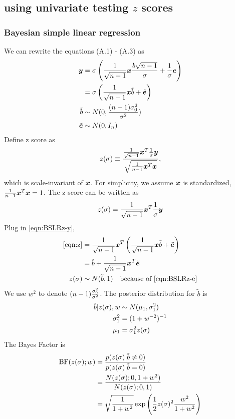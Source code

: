 \subsection{\susie using univariate testing $z$ scores} \label{sec:summary z}
\subsubsection{Bayesian simple linear regression}
We can rewrite the equations (A.1) - (A.3) as
\begin{align}
\bm y &= \sigma\left( \frac{1}{\sqrt{n-1}} \bm x \frac{b\sqrt{n-1}}{\sigma} + \frac { 1}{\sigma} \bm e \right) \\
 &= \sigma\left( \frac{1}{\sqrt{n-1}} \bm x \tilde{b} + \tilde{\bm e} \right) \label{eqn:BSLRz-y}\\
\tilde{b} &\sim N(0, \frac{(n-1) \sigma^2_{0}}{\sigma^2}) \\
\tilde{\bm e} & \sim N(0,I_n) \label{eqn:BSLRz-e}
\end{align}
Define z score as 
\begin{equation}
    z(\sigma) \equiv \frac{\frac{1}{\sqrt{n-1}}\bm x^T \frac{1}{\sigma}\bm y}{ \sqrt{\frac{1}{n-1}\bm x^T\bm x}},
\end{equation}
which is scale-invariant of $\bm x$. For simplicity, we assume $\bm x$ is standardized, $\frac{1}{n-1}\bm x^T\bm x = 1$. The z score can be written as
\begin{equation}\label{eqn:z}
    z(\sigma) = \frac{1}{\sqrt{n-1}}\bm x^T \frac{1}{\sigma}\bm y
\end{equation}
Plug in \eqref{eqn:BSLRz-y},
\begin{align}
    \eqref{eqn:z} &= \frac{1}{\sqrt{n-1}}\bm x^T \left( \frac{1}{\sqrt{n-1}} \bm x \tilde{b} + \tilde{\bm e} \right) \label{eqn:BSLRz-z}\\
    &= \tilde{b} + \frac{1}{\sqrt{n-1}}\bm x^T\tilde{\bm e} \\
    z(\sigma) &\sim N(\tilde{b}, 1) \quad \text{because of \eqref{eqn:BSLRz-e}} \label{eqn:BSLRz-zdistr}
\end{align}
We use $w^2$ to denote $(n-1)\frac{\sigma^2_0}{\sigma^2}$. The posterior distribution for $\tilde{b}$ is
\begin{align}
    \tilde{b} | z(\sigma), w &\sim N(\mu_1, \sigma^2_1) \\
    \sigma^2_1 &= (1 + w^{-2})^{-1} \\
    \mu_1 &= \sigma^2_1 z(\sigma)
\end{align}
The Bayes Factor is 
\begin{align}
    \text{BF}(z(\sigma); w) &=  \frac{p(z(\sigma) | \tilde{b} \neq 0)}{p(z(\sigma) | \tilde{b} = 0)}\label{eqn:BSLRz-BF} \\
    &= \frac{N(z(\sigma); 0, 1+w^2)}{N(z(\sigma); 0, 1)} \\
    &= \sqrt{\frac{1}{1+w^2}} \exp\left( \frac{1}{2} z(\sigma)^2 \frac{w^2}{1+w^2} \right)
\end{align}
